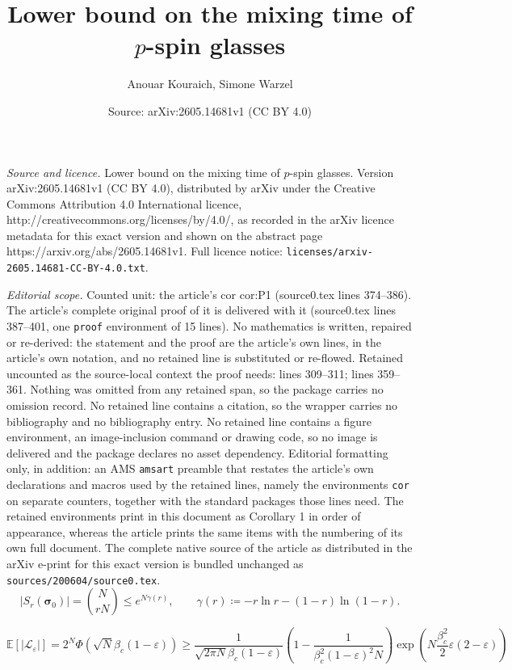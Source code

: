 \documentclass[10pt,a4paper]{amsart}
\title{Lower bound on the mixing time of $p$-spin glasses}
\author{Anouar Kouraich, Simone Warzel}
\date{Source: arXiv:2605.14681v1 (CC BY 4.0)}
\newcommand{\bsig}{\boldsymbol{\sigma} }
\begin{document}
\maketitle

\noindent\emph{Source and licence.} Lower bound on the mixing time of $p$-spin glasses. Version arXiv:2605.14681v1 (CC BY 4.0), distributed by arXiv under the Creative Commons Attribution 4.0 International licence, http://creativecommons.org/licenses/by/4.0/, as recorded in the arXiv licence metadata for this exact version and shown on the abstract page https://arxiv.org/abs/2605.14681v1. Full licence notice: \texttt{licenses/arxiv-2605.14681-CC-BY-4.0.txt}.\par\smallskip

\noindent\textit{Editorial scope.} Counted unit: the article's cor cor:P1 (source0.tex lines 374--386). The article's complete original proof of it is delivered with it (source0.tex lines 387--401, one \texttt{proof} environment of 15 lines). No mathematics is written, repaired or re-derived: the statement and the proof are the article's own lines, in the article's own notation, and no retained line is substituted or re-flowed.  Retained uncounted as the source-local context the proof needs: lines 309--311; lines 359--361.  Nothing was omitted from any retained span, so the package carries no omission record.  No retained line contains a citation, so the wrapper carries no bibliography and no bibliography entry.  No retained line contains a figure environment, an image-inclusion command or drawing code, so no image is delivered and the package declares no asset dependency.  Editorial formatting only, in addition: an AMS \texttt{amsart} preamble that restates the article's own declarations and macros used by the retained lines, namely the environments \texttt{cor} on separate counters, together with the standard packages those lines need.  The retained environments print in this document as Corollary 1 in order of appearance, whereas the article prints the same items with the numbering of its own full document.  The complete native source of the article as distributed in the arXiv e-print for this exact version is bundled unchanged as \texttt{sources/200604/source0.tex}.
\begin{equation}\label{eq:binom}
  \left| S_r(\bsig_0)\right| = \binom{N}{rN} \leq e^{ N \gamma(r) } , \qquad \gamma(r) \coloneqq - r \ln r - (1-r) \ln(1-r) .
\end{equation}

\begin{equation}\label{eq:Llower}
\mathbb{E}\left[| \mathcal{L}_{\varepsilon}  | \right] = 2^N \Phi\left(\sqrt{N} \beta_c (1-\varepsilon)\right) \geq \frac{1}{\sqrt{2\pi N} \beta_c (1-\varepsilon)} \left( 1 - \frac{1}{\beta_c^2 (1-\varepsilon)^2 N} \right) \exp\left(N \frac{\beta_c^2}{2} \varepsilon (2 - \varepsilon) \right) 
\end{equation}
\end{document}
